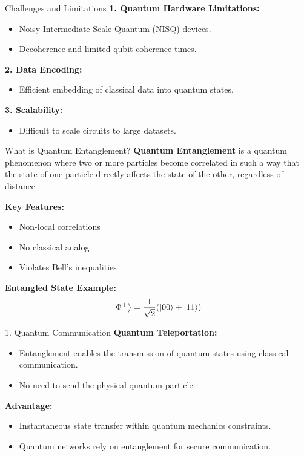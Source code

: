 \documentclass{beamer}
\begin{document}
\begin{frame}{Challenges and Limitations}
\textbf{1. Quantum Hardware Limitations:}
\begin{itemize}
    \item Noisy Intermediate-Scale Quantum (NISQ) devices.
    \item Decoherence and limited qubit coherence times.
\end{itemize}

\textbf{2. Data Encoding:}
\begin{itemize}
    \item Efficient embedding of classical data into quantum states.
\end{itemize}

\textbf{3. Scalability:}
\begin{itemize}
    \item Difficult to scale circuits to large datasets.
\end{itemize}
\end{frame}




\begin{frame}{What is Quantum Entanglement?}
\textbf{Quantum Entanglement} is a quantum phenomenon where two or more particles become correlated in such a way that the state of one particle directly affects the state of the other, regardless of distance.

\vspace{10pt}
\textbf{Key Features:}
\begin{itemize}
    \item Non-local correlations
    \item No classical analog
    \item Violates Bell's inequalities
\end{itemize}

\textbf{Entangled State Example:}
\[
\ket{\Phi^+} = \frac{1}{\sqrt{2}} (\ket{00} + \ket{11})
\]

\end{frame}


\begin{frame}{1. Quantum Communication}
\textbf{Quantum Teleportation:}
\begin{itemize}
    \item Entanglement enables the transmission of quantum states using classical communication.
    \item No need to send the physical quantum particle.
\end{itemize}

\textbf{Advantage:}
\begin{itemize}
\item Instantaneous state transfer within quantum mechanics constraints.
\item Quantum networks rely on entanglement for secure communication.
  \end{itemize}
\end{frame}
\end{document}
